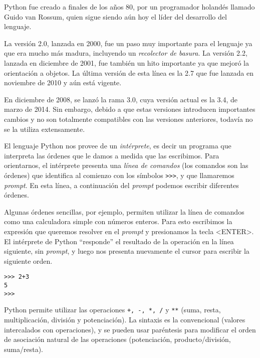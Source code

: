 \begin{sabias_que}
Python fue creado a finales de los años 80, por un programador holandés
llamado Guido van Rossum, quien sigue siendo aún hoy el líder del
desarrollo del lenguaje.

La versión 2.0, lanzada en 2000, fue un paso muy importante para el
lenguaje ya que era mucho más madura, incluyendo un \textit{recolector de
basura}.  La versión 2.2, lanzada en diciembre de 2001, fue también un hito
importante ya que mejoró la orientación a objetos.  La última versión de
esta línea es la 2.7 que fue lanzada en noviembre de 2010 y aún está vigente.

En diciembre de 2008, se lanzó la rama 3.0, cuya versión actual es la
3.4, de marzo de 2014. Sin embargo, debido a que estas versiones
introducen importantes cambios y no son totalmente compatibles
con las versiones anteriores, todavía no se la utiliza extensamente.
\end{sabias_que}

El lenguaje Python nos provee de un {\it intérprete}, es decir un programa que
interpreta las órdenes que le damos a medida que las escribimos. Para
orientarnos, el intérprete presenta una {\it línea de comandos} (los comandos
son las órdenes) que identifica al comienzo con los símbolos
\lstinline!>>>!, y que
llamaremos {\it prompt}. En esta línea, a continuación del {\it prompt}
podemos escribir diferentes órdenes.


Algunas órdenes sencillas, por ejemplo, permiten utilizar la línea de comandos
como una calculadora simple con números enteros. Para esto escribimos la
expresión que queremos resolver en el {\it prompt} y presionamos la tecla
<ENTER>. El intérprete de Python ``responde'' el resultado de la operación en
la línea siguiente, sin {\it prompt}, y luego nos presenta nuevamente el
cursor para escribir la siguiente orden.

\begin{lstlisting}[numbers=none]
>>> 2+3
5
>>>
\end{lstlisting}

Python permite utilizar las operaciones \lstinline!+, -, *, /! y \lstinline!**!
(suma, resta, multiplicación, división y potenciación). La sintaxis es la
convencional (valores intercalados con operaciones), y se pueden usar
paréntesis para modificar el orden de asociación natural de las operaciones
(potenciación, producto/división, suma/resta).

